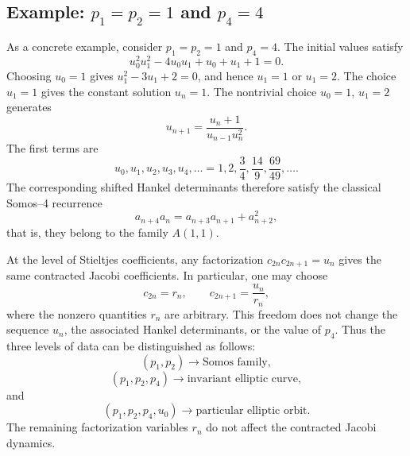\documentclass[11pt]{article}
\theoremstyle{remark}
\begin{document}
\subsection{Example: $p_1=p_2=1$ and $p_4=4$}
As a concrete example, consider $p_1=p_2=1$ and $p_4=4$. The initial values satisfy
\begin{equation}
u_0^{2}u_1^{2}-4u_0u_1+u_0+u_1+1=0.
\end{equation}
Choosing $u_0=1$ gives $u_1^2-3u_1+2=0$, and hence $u_1=1$ or $u_1=2$. The choice $u_1=1$ gives the constant solution $u_n=1$. The nontrivial choice $u_0=1$, $u_1=2$ generates
\begin{equation}
u_{n+1}=\frac{u_n+1}{u_{n-1}u_n^{2}}.
\end{equation}
The first terms are
\[
u_0,u_1,u_2,u_3,u_4,\ldots=1,2,\frac34,\frac{14}{9},\frac{69}{49},\ldots.
\]
The corresponding shifted Hankel determinants therefore satisfy the classical Somos--4 recurrence
\[
a_{n+4}a_n=a_{n+3}a_{n+1}+a_{n+2}^{2},
\]
that is, they belong to the family $A(1,1)$.

At the level of Stieltjes coefficients, any factorization $c_{2n}c_{2n+1}=u_n$ gives the same contracted Jacobi coefficients. In particular, one may choose
\[
c_{2n}=r_n,\qquad c_{2n+1}=\frac{u_n}{r_n},
\]
where the nonzero quantities $r_n$ are arbitrary. This freedom does not change the sequence $u_n$, the associated Hankel determinants, or the value of $p_4$.
Thus the three levels of data can be distinguished as follows:
\[
(p_1,p_2)\longrightarrow\text{Somos family},
\]
\[
(p_1,p_2,p_4)\longrightarrow\text{invariant elliptic curve},
\]
and
\[
(p_1,p_2,p_4,u_0)\longrightarrow\text{particular elliptic orbit}.
\]
The remaining factorization variables $r_n$ do not affect the contracted Jacobi dynamics.
\end{document}
